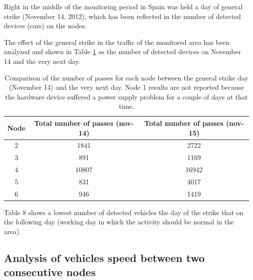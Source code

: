 \documentclass[preprint,authoryear,12pt]{elsarticle}
\begin{document}
Right in the middle of the monitoring period in Spain was held a day of general strike (November 14, 2012), which has been reflected in the number of detected devices (cars) on the nodes.

The effect of the general strike in the traffic of the monitored area has been analyzed and shown in Table \ref{huelga} as the number of detected devices on November 14 and the very next day.

 \begin{table}
 \begin{center}
 \begin{tabular}{|c|c|c|}
 \hline
 Node  &  Total number of passes (nov-14) & Total number of passes (nov-15) \\
 \hline
 2	& 1841  & 2722  \\
 \hline
 3	& 891   & 1169 \\
 \hline
 4	& 10807	& 16942 \\
 \hline
 5	& 831  	& 4017\\
 \hline
 6	& 946   & 1419 \\
 \hline
 \end{tabular}
 \end{center}
 \caption{Comparison of the number of passes for each node between the general strike day (November 14) and the very next day. Node 1 results are not reported because the hardware device suffered a power supply problem for a couple of days at that time.
 \label{huelga}}
 \end{table}

Table 8 shows a lowest number of detected vehicles the day of the strike that on the following day (working day in which the activity should be normal in the area).


\subsection{Analysis of vehicles speed between two consecutive nodes}
\end{document}
